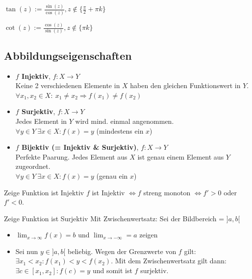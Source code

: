 \documentclass[a4paper]{article}
\begin{document}
\begin{compactdesc}
    \item[Tangens:] $\tan(z) := \frac{\sin(z)}{\cos(z)}, z \not\in \{\frac{\pi}{2} + \pi k\}$
    \item[Cotangens:] $\cot(z) := \frac{\cos(z)}{\sin(z)}, z \not\in \{\pi k\}$
\end{compactdesc}

\subsection{Abbildungseigenschaften}
\begin{itemize}[leftmargin=4.5mm, topsep=1pt, parsep=1pt]
  \item \textbf{$f$ Injektiv}, $f: X \rightarrow Y$ \\
        Keine 2 verschiedenen Elemente in $X$ haben den gleichen Funktionswert in $Y$. \\
        $\forall x_1, x_2 \in X: \ x_1 \neq x_2 \Rightarrow f(x_1) \neq f(x_2)$
  \item \textbf{$f$ Surjektiv}, $f: X \rightarrow Y$ \\
        Jedes Element in $Y$ wird mind. einmal angenommen. \\
        $\forall y \in Y \ \exists x \in X : f(x) = y$ (mindestens ein $x$)
  \item \textbf{$f$ Bijektiv (= Injektiv \& Surjektiv)}, $f: X \rightarrow Y$ \\
        Perfekte Paarung. Jedes Element aus $X$ ist genau einem Element aus $Y$ zugeordnet. \\
        $\forall y \in Y \ \exists x \in X : f(x) = y$ (genau ein $x$)
\end{itemize}

\begin{bspbox}{Zeige Funktion ist Injektiv}
  $f$ ist Injektiv $\Leftrightarrow f$ streng monoton $\Leftrightarrow f'>0$ oder $f'<0$.
\end{bspbox}

\begin{bspbox}{Zeige Funktion ist Surjektiv}
  Mit Zwischenwertsatz: Sei der Bildbereich = $]a,b[$
  \begin{itemize}[leftmargin=4.5mm, topsep=1pt, parsep=1pt]
    \item[1.] $\lim_{x \rightarrow \infty} f(x) = b$ und $\lim_{x \rightarrow -\infty} = a$ zeigen
    \item[2.] Sei nun $y \in ]a,b[$ beliebig. Wegen der Grenzwerte von $f$ gilt: $\exists x_1 < x_2 : f(x_1) < y < f(x_2)$. Mit dem Zwischenwertsatz gilt dann: \\ $\exists c \in [x_1,x_2] : f(c) = y$ und somit ist $f$ surjektiv.
  \end{itemize}
\end{bspbox}
\end{document}
